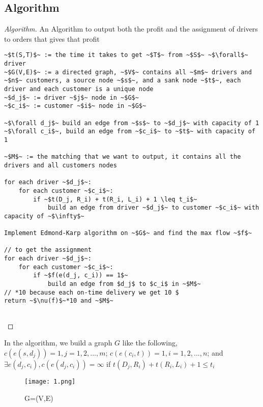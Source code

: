 \documentclass[openany]{article}
\begin{document}
\subsection*{Algorithm}
\begin{proof}[Algorithm]{}
		\renewcommand{\qedsymbol}{}
		An Algorithm to output both the profit and the assignment of drivers to orders that gives that profit
		\begin{lstlisting}[basicstyle=\fontsize{8}{9}\selectfont\ttfamily]
~$t(S,T)$~ := the time it takes to get ~$T$~ from ~$S$~ ~$\forall$~ driver
~$G(V,E)$~ := a directed graph, ~$V$~ contains all ~$m$~ drivers and ~$n$~ customers, a source node ~$s$~, and a sank node ~$t$~, each driver and each customer is a unique node
~$d_j$~ := driver ~$j$~ node in ~$G$~
~$c_i$~ := customer ~$i$~ node in ~$G$~

~$\forall d_j$~ build an edge from ~$s$~ to ~$d_j$~ with capacity of 1
~$\forall c_i$~, build an edge from ~$c_i$~ to ~$t$~ with capacity of 1

~$M$~ := the matching that we want to output, it contains all the drivers and all customers nodes

for each driver ~$d_j$~:
    for each customer ~$c_i$~:
        if ~$t(D_j, R_i) + t(R_i, L_i) + 1 \leq t_i$~
            build an edge from driver ~$d_j$~ to customer ~$c_i$~ with capacity of ~$\infty$~

Implement Edmond-Karp algorithm on ~$G$~ and find the max flow ~$f$~

// to get the assignment
for each driver ~$d_j$~:
    for each customer ~$c_i$~:
        if ~$f(e(d_j, c_i)) == 1$~
            build an edge from $d_j$ to $c_i$ in ~$M$~
// *10 because each on-time delivery we get 10 $
return ~$\nu(f)$~*10 and ~$M$~
        
		\end{lstlisting} 
\end{proof}

In the algorithm, we build a graph $G$ like the following, $c(e(s,d_j)) = 1, j=1,2,...,m$; $c(e(c_i,t)) = 1, i = 1,2,...,n$; and $\exists e(d_j, c_i), c(e(d_j,c_i)) = \infty$ if $t(D_j,R_i)+t(R_i,L_i)+1 \leq t_i$
\begin{figure}[htp]
    \centering
    \texttt{[image: 1.png]}
    \caption{G=(V,E)}
    \label{fig:galaxy}
\end{figure}
\end{document}
